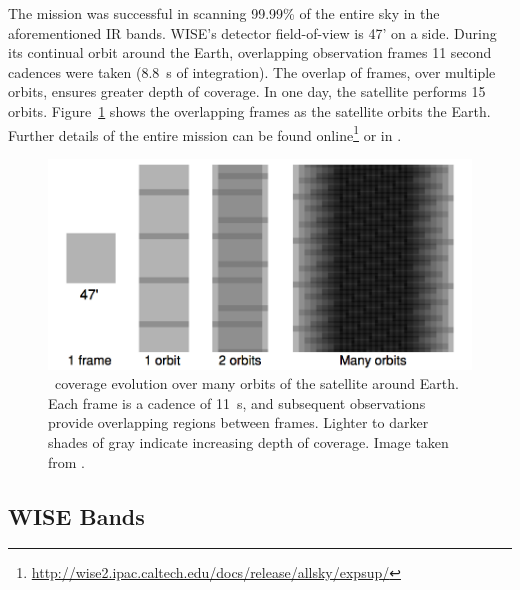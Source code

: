 
    The mission was successful in scanning 99.99\% of the entire sky in the aforementioned IR bands. WISE's detector field-of-view is 47' on a side. During its continual orbit around the Earth, overlapping observation frames 11 second cadences were taken (8.8~s of integration). The overlap of frames, over multiple orbits, ensures greater depth of coverage. In one day, the satellite performs 15 orbits. Figure~\ref{fig:wise_scan_plan} shows the overlapping frames as the satellite orbits the Earth. Further details of the entire mission can be found online\footnote{\url{http://wise2.ipac.caltech.edu/docs/release/allsky/expsup/}} or in \citet{Wright2010}. 

    \begin{figure}
    \centering
    \includegraphics[width=\textwidth]{Ch2/wise_scan_plan}
    \caption[\WS\ Sky Coverage]{\WS\ coverage evolution over many orbits of the satellite around Earth. Each frame is a cadence of 11~s, and subsequent observations provide overlapping regions between frames. Lighter to darker shades of gray indicate increasing depth of coverage. Image taken from \citet{Wright2010}.}
    \label{fig:wise_scan_plan}
    \end{figure}
    
    
   
   
    \subsection{WISE Bands}\label{sec:wise_bands}

